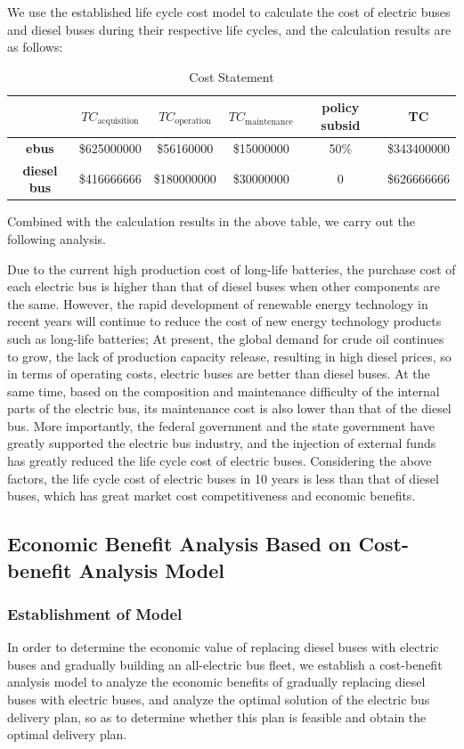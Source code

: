 \documentclass[12pt]{article}
\begin{document}
We use the established life cycle cost model to calculate the cost of electric buses and diesel buses during their respective 
life cycles, and the calculation results are as follows:
\begin{table}[!htbp]
		\centering
		\caption{Cost Statement}
		\begin{tabular}{|c|c|c|c|c|c|}
		\hline
		  &\textbf{$TC_\text{acquisition}$} & \textbf{$TC_\text{operation}$} &\textbf{$TC_\text{maintenance}$}&\textbf{policy subsid}&\textbf{TC}\\
		\hline
		\textbf{ebus} &\$625000000&\$56160000&\$15000000&50\%&\$343400000\\
		\hline
		\textbf{diesel bus} &\$416666666&\$180000000&\$30000000&0&\$626666666\\
		\hline
		\end{tabular}
\end{table}


Combined with the calculation results in the above table, we carry out the following analysis.

Due to the current high production cost of long-life batteries, the purchase cost of each electric bus is higher than that of diesel 
buses when other components are the same. However, the rapid development of renewable energy technology in recent years will continue 
to reduce the cost of new energy technology products such as long-life batteries; At present, the global demand for crude oil continues 
to grow, the lack of production capacity release, resulting in high diesel prices, so in terms of operating costs, electric buses 
are better than diesel buses. At the same time, based on the composition and maintenance difficulty of the internal parts of the 
electric bus, its maintenance cost is also lower than that of the diesel bus. More importantly, the federal government and the state 
government have greatly supported the electric bus industry, and the injection of external funds has greatly reduced the life cycle 
cost of electric buses. Considering the above factors, the life cycle cost of electric buses in 10 years is less than that of diesel 
buses, which has great market cost competitiveness and economic benefits.

\subsection{Economic Benefit Analysis Based on Cost-benefit Analysis Model}
\subsubsection{Establishment of Model}
In order to determine the economic value of replacing diesel buses with electric buses and gradually building an all-electric bus 
fleet, we establish a cost-benefit analysis model to analyze the economic benefits of gradually replacing diesel buses with electric 
buses, and analyze the optimal solution of the electric bus delivery plan, so as to determine whether this plan is feasible and obtain 
the optimal delivery plan.
\end{document}
